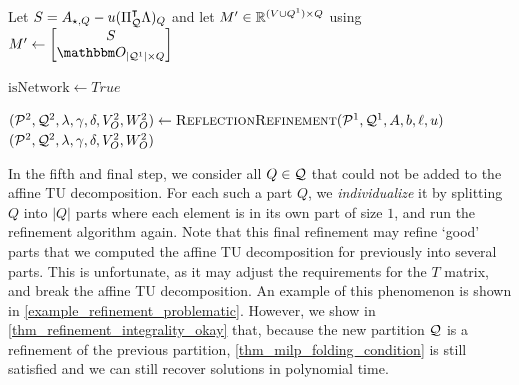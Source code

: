 \documentclass[pdflatex,sn-mathphys-num]{sn-jnl}%
\theoremstyle{thmstyleone}%
\theoremstyle{thmstylethree}%
\theoremstyle{thmstyletwo}%
\begin{document}
{{\begin{algorithm}[H]
{        Let $S = A_{\star,Q} - u (\Pi^{\intercal}_{\mathcal{Q}} \Lambda)_{Q}$ and let $M'\in \mathbb{R}^{(V\cup Q^1) \times Q}$ using $M' \gets \begin{bmatrix}
            S\\
            \zerovec_{|\MQ^1|\times Q}
        \end{bmatrix}$\;

        $\mathrm{isNetwork} \gets True$\;
    }
    \label{algo_eos_end_ATU}
    $(\mathcal{P}^2,\mathcal{Q}^2, \lambda, \gamma, \delta, V^2_O, W^2_O) \gets \textsc{ReflectionRefinement}(\mathcal{P}^1, \mathcal{Q}^1, A, b, \ell, u)$\label{algo_eos_additional_refinements}\;
    \Return $(\mathcal{P}^2,\mathcal{Q}^2, \lambda, \gamma, \delta, V^2_O, W^2_O)$\;
\end{algorithm}
}
}

In the fifth and final step, we consider all $Q\in \mathcal{Q}$ that could not be added to the affine TU decomposition. For each such a part $Q$, we \emph{individualize} it by splitting $Q$ into $|Q|$ parts where each element is in its own part of size $1$, and run the refinement algorithm again. Note that this final refinement may refine `good' parts that we computed the affine TU decomposition for previously into several parts. This is unfortunate, as it may adjust the requirements for the $T$ matrix, and break the affine TU decomposition. An example of this phenomenon is shown in \cref{example_refinement_problematic}.
However, we show in \cref{thm_refinement_integrality_okay} that, because the new partition $\mathcal{Q}$ is a refinement of the previous partition, \eqref{thm_milp_folding_condition} is still satisfied and we can still recover solutions in polynomial time.
\end{document}
